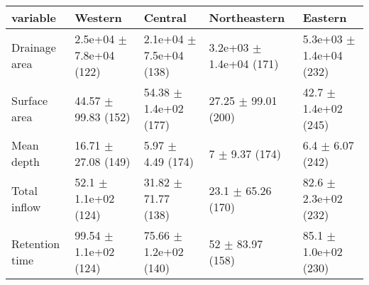 \documentclass{article}
\begin{document}
\begin{landscape}
\begin{table}[!h]
\centering
\begin{tabular}{lllll}
\toprule
variable & Western & Central & Northeastern & Eastern\\
\midrule
Drainage area & 2.5e+04 $\pm$ 7.8e+04 (122) & 2.1e+04 $\pm$ 7.5e+04 (138) & 3.2e+03 $\pm$ 1.4e+04 (171) & 5.3e+03 $\pm$ 1.4e+04 (232)\\
Surface area & 44.57 $\pm$ 99.83 (152) & 54.38 $\pm$ 1.4e+02 (177) & 27.25 $\pm$ 99.01 (200) & 42.7 $\pm$ 1.4e+02 (245)\\
Mean depth & 16.71 $\pm$ 27.08 (149) & 5.97 $\pm$ 4.49 (174) & 7 $\pm$ 9.37 (174) & 6.4 $\pm$ 6.07 (242)\\
Total inflow & 52.1 $\pm$ 1.1e+02 (124) & 31.82 $\pm$ 71.77 (138) & 23.1 $\pm$ 65.26 (170) & 82.6 $\pm$ 2.3e+02 (232)\\
Retention time & 99.54 $\pm$ 1.1e+02 (124) & 75.66 $\pm$ 1.2e+02 (140) & 52 $\pm$ 83.97 (158) & 85.1 $\pm$ 1.0e+02 (230)\\
\bottomrule
\end{tabular}
\end{table}
\end{landscape}
\end{document}
